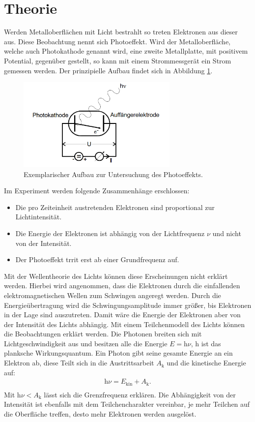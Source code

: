 \section{Theorie}
 \label{sec:Theorie}
Werden Metalloberflächen mit Licht bestrahlt so treten Elektronen aus dieser aus.
Diese Beobachtung nennt sich Photoeffekt. Wird der Metalloberfläche, welche auch Photokathode genannt wird,
eine zweite Metallplatte, mit positivem Potential, gegenüber gestellt, so kann mit einem Strommessgerät ein
Strom gemessen werden. Der prinzipielle Aufbau findet sich in Abbildung \ref{fig:aufbau}.
\begin{figure}
  \centering
 \includegraphics[width=0.7\textwidth]{aufbau.png}
\caption{Exemplarischer Aufbau zur Untersuchung des Photoeffekts.\cite{sample}}
 \label{fig:aufbau}
  \end{figure}
  Im Experiment werden folgende Zusammenhänge erschlossen:
  \begin{itemize}
    \item Die pro Zeiteinheit austretenden Elektronen sind proportional zur Lichtintensität.
    \item Die Energie der Elektronen ist abhängig von der Lichtfrequenz $\nu$ und nicht von der Intensität.
    \item Der Photoeffekt trrit erst ab einer Grundfrequenz auf.
  \end{itemize}
  Mit der Wellentheorie des Lichts können diese Erscheinungen nicht erklärt werden.
  Hierbei wird angenommen, dass die Elektronen durch die einfallenden elektromagnetischen Wellen zum Schwingen angeregt werden.
  Durch die Energieübertragung wird die Schwingungsamplitude immer größer, bis Elektronen in der Lage sind auszutreten.
  Damit wäre die Energie der Elektronen aber von der Intensität des Lichts abhängig.
  Mit einem Teilchenmodell des Lichts können die Beobachtungen erklärt werden.
  Die Photonen breiten sich mit Lichtgeschwindigkeit aus und besitzen alle die Energie $E=\mathrm{h}\nu$, $\mathrm{h}$ ist das planksche
  Wirkungsquantum. Ein Photon gibt seine gesamte Energie an ein Elektron ab, diese Teilt sich in die Austrittsarbeit $A_\mathrm{k}$ und
  die kinetische Energie auf:
  \begin{align*}
  \mathrm{h}\nu=E_\mathrm{kin} + A_\mathrm{k}.\\
  \end{align*}
  Mit $\mathrm{h}\nu < A_\mathrm{k}$ lässt sich die Grenzfrequenz erklären.
  Die Abhängigkeit von der Intensität ist ebenfalls mit dem Teilchencharakter vereinbar, je mehr Teilchen auf die Oberfläche treffen,
  desto mehr Elektronen werden ausgelöst.
